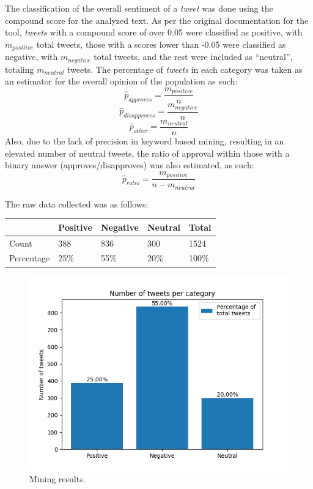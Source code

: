\documentclass[conference]{IEEEtran}
\begin{document}
The classification of the overall sentiment of a \emph{tweet} was done using the compound score for the analyzed text. As per the original documentation for the tool, \emph{tweets} with a compound score of over 0.05 were classified as positive, with \(m_{positive}\) total tweets, those with a scores lower than -0.05 were classified as negative, with \(m_{negative}\) total tweets, and the rest were included as ``neutral'', totaling \(m_{neutral}\) tweets. The percentage of \emph{tweets} in each category was taken as an estimator for the overall opinion of the population as such:
$$ \hat{p}_{approves} = \frac{m_{positive}}{n} $$
$$ \hat{p}_{disapproves} = \frac{m_{negative}}{n} $$
$$ \hat{p}_{other} = \frac{m_{neutral}}{n} $$
Also, due to the lack of precision in keyword based mining, resulting in an elevated number of neutral tweets, the ratio of approval within those with a binary answer (approves/disapproves) was also estimated, as such:
$$ \hat{p}_{ratio} = \frac{m_{positive}}{n - m_{neutral}} $$

The raw data collected was as follows:
\begin{center}
\begin{tabular}{lllll}
 & Positive & Negative & Neutral & Total\\
\hline
Count & 388 & 836 & 300 & 1524\\
Percentage & 25\% & 55\% & 20\% & 100\%\\
\end{tabular}
\end{center}

\begin{figure}[H]
\centering
\includegraphics[width=\linewidth]{./ValsTwitter.png}
\caption{\label{fig:mined}Mining results.}
\end{figure}
\end{document}
